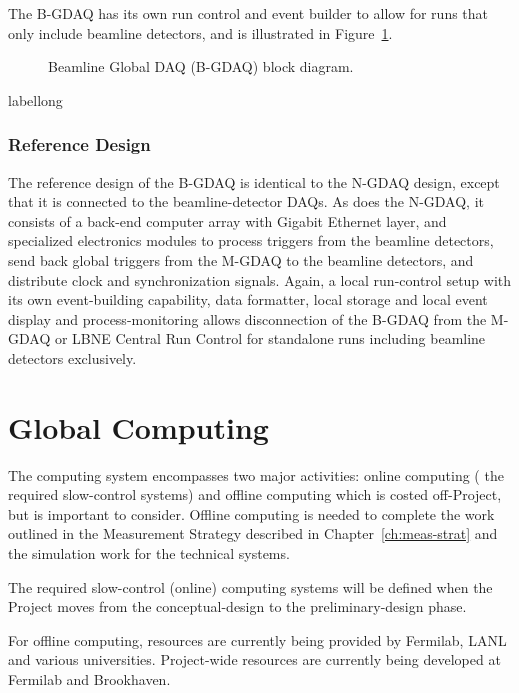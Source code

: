 The B-GDAQ has its own run control and event builder to allow for runs that 
only include beamline detectors, and is illustrated in Figure~\ref{fig:GDAQ_B_Block}.

\begin{figure}[htp]
\begin{center}
\caption{\label{fig:GDAQ_B_Block} Beamline Global DAQ (B-GDAQ) block 
diagram.  %
}
\end{center}
\end{figure}
\begin{cdrfigure}[short]{label}{long}
\end{cdrfigure}

\subsubsection{Reference Design}

The reference design of the B-GDAQ is %
identical to the 
N-GDAQ design, except that it is connected to the beamline-detector DAQs. 
As does the N-GDAQ, it 
consists of a back-end computer array with Gigabit Ethernet layer, 
and specialized electronics modules to process triggers from the 
beamline detectors, send back global triggers from the %
M-GDAQ  %
to the 
beamline detectors, and distribute clock and synchronization signals. 
Again, a local run-control setup with its own event-building capability, 
data formatter, local storage and local event display and process-monitoring 
allows disconnection of the B-GDAQ from the %
M-GDAQ  %
or LBNE 
Central Run Control for standalone runs including beamline 
detectors exclusively.


\section{Global Computing}
The computing system encompasses two major activities: %
online computing (%
the required slow-control systems) and %
offline 
computing which is costed off-Project, but is important to consider.
Offline computing is needed to complete 
the work outlined in the Measurement Strategy described in Chapter~\ref{ch:meas-strat} and the simulation work %
for the technical systems.

The required slow-control (online) computing systems will be defined when the Project moves 
from the conceptual-design to the preliminary-design phase.

For offline computing, resources are currently being provided by Fermilab, 
LANL and various universities.  Project-wide resources are currently 
being developed at Fermilab and Brookhaven.
